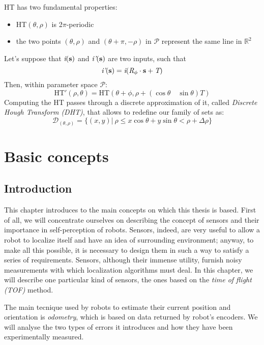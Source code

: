 \documentclass[a4paper, onecolumn]{report}
\begin{document}
HT has two fundamental properties:
\begin{itemize}
	\item{\mbox{HT}$(\theta, \rho)$ is 2$\pi$-periodic}
	\item{the two points $(\theta, \rho)$ and $(\theta+\pi, -\rho)$ in $\mathcal{P}$ represent the same line in $\mathbb{R}^2$}
\end{itemize}
Let's suppose that $\emph{i}(\bf{s})$ and $\emph{i'}(\bf{s})$ are two inputs, such that
\begin{equation}
	\emph{i'}(\bf{s}) = \emph{i}(\emph{R}_\phi \cdot \bf{s} + \emph{T})
\end{equation}
Then, within parameter space $\mathcal{P}$:
\begin{equation}
	\mbox{HT}'(\rho, \theta) = \mbox{HT}(\theta+\phi, \rho+(\cos\theta \quad \sin\theta)T)
\end{equation}
Computing the HT passes through a discrete approximation of it, called \emph{Discrete Hough Transform (DHT)}, that allows to redefine our family of sets as:
\begin{equation}
	\mathcal{D}_{(\theta, \rho)} = \{(x,y) | \ \rho\le x\cos\theta + y\sin\theta < \rho + \Delta\rho\} 
\end{equation}
\chapter{Basic concepts}
\section{Introduction}
This chapter introduces to the main concepts on which this thesis is based. 
First of all, we will concentrate ourselves on describing the concept of sensors and their importance in self-perception of robots. Sensors, indeed, are very useful to allow a robot to localize itself and have an idea of surrounding environment; anyway, to make all this possible, it is necessary to design them in such a way to satisfy a series of requirements. Sensors, although their immense utility, furnish noisy measurements with which localization algorithms must deal.
In this chapter, we will describe one particular kind of sensors, the ones based on the \emph{time of flight (TOF)} method.

The main tecnique used by robots to estimate their current position and orientation is \emph{odometry}, which is based on data returned by robot's encoders. We will analyse the two types of errors it introduces and how they have been experimentally measured.
\end{document}
